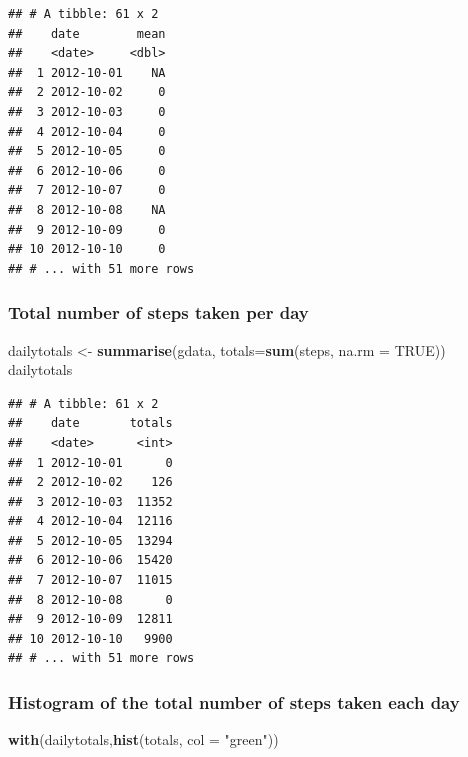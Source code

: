 \documentclass[]{article}
\newenvironment{Shaded}{\begin{snugshade}}{\end{snugshade}}
\newcommand{\KeywordTok}[1]{\textcolor[rgb]{0.13,0.29,0.53}{\textbf{#1}}}
\newcommand{\DataTypeTok}[1]{\textcolor[rgb]{0.13,0.29,0.53}{#1}}
\newcommand{\StringTok}[1]{\textcolor[rgb]{0.31,0.60,0.02}{#1}}
\newcommand{\OtherTok}[1]{\textcolor[rgb]{0.56,0.35,0.01}{#1}}
\newcommand{\NormalTok}[1]{#1}
\begin{document}
\begin{verbatim}
## # A tibble: 61 x 2
##    date        mean
##    <date>     <dbl>
##  1 2012-10-01    NA
##  2 2012-10-02     0
##  3 2012-10-03     0
##  4 2012-10-04     0
##  5 2012-10-05     0
##  6 2012-10-06     0
##  7 2012-10-07     0
##  8 2012-10-08    NA
##  9 2012-10-09     0
## 10 2012-10-10     0
## # ... with 51 more rows
\end{verbatim}

\subsubsection{Total number of steps taken per
day}\label{total-number-of-steps-taken-per-day}

\begin{Shaded}
\begin{Highlighting}[]
\NormalTok{dailytotals <-}\StringTok{ }\KeywordTok{summarise}\NormalTok{(gdata, }\DataTypeTok{totals=}\KeywordTok{sum}\NormalTok{(steps, }\DataTypeTok{na.rm =} \OtherTok{TRUE}\NormalTok{))}
\NormalTok{dailytotals}
\end{Highlighting}
\end{Shaded}

\begin{verbatim}
## # A tibble: 61 x 2
##    date       totals
##    <date>      <int>
##  1 2012-10-01      0
##  2 2012-10-02    126
##  3 2012-10-03  11352
##  4 2012-10-04  12116
##  5 2012-10-05  13294
##  6 2012-10-06  15420
##  7 2012-10-07  11015
##  8 2012-10-08      0
##  9 2012-10-09  12811
## 10 2012-10-10   9900
## # ... with 51 more rows
\end{verbatim}

\subsubsection{Histogram of the total number of steps taken each
day}\label{histogram-of-the-total-number-of-steps-taken-each-day}

\begin{Shaded}
\begin{Highlighting}[]
\KeywordTok{with}\NormalTok{(dailytotals,}\KeywordTok{hist}\NormalTok{(totals, }\DataTypeTok{col =} \StringTok{"green"}\NormalTok{))}
\end{Highlighting}
\end{Shaded}
\end{document}
